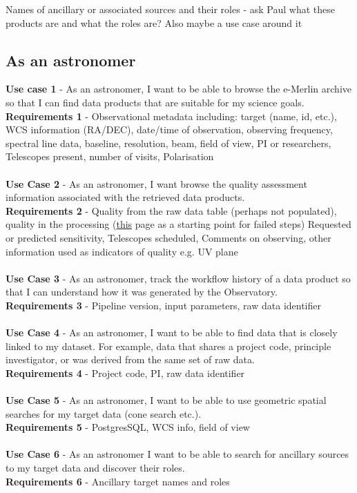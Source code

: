 Names of ancillary or associated sources and their roles - ask Paul what these products are and what the roles are? Also maybe a use case around it

\subsection{As an astronomer}

{\bf Use case 1} - As an astronomer, I want to be able to browse the e-Merlin archive so that I can find data products that are suitable for my science goals.
\\
{\bf Requirements 1} - Observational metadata including: target (name, id, etc.), WCS information (RA/DEC), date/time of observation, observing  frequency, spectral line data, baseline, resolution, beam, field of view, PI or researchers, Telescopes present, number of visits, Polarisation
\\\\
{\bf Use Case 2} - As an astronomer, I want browse the quality assessment information associated with the retrieved data products.
\\
{\bf Requirements 2} - Quality from the raw data table (perhaps not populated), quality in the processing (\href{https://www.e-merlin.ac.uk/distribute/CY8/TS8004/TS8004_C_001_20190801/weblog/pipelineinfo.html}{this} page as a starting point for failed steps) Requested or predicted sensitivity, Telescopes scheduled, Comments on observing, other information used as indicators of quality e.g. UV plane
\\\\
{\bf Use Case 3} - As an astronomer, track the workflow history of a data product so that I can understand how it was generated by the Observatory.
\\
{\bf Requirements 3} - Pipeline version, input parameters, raw data identifier
\\\\
{\bf Use Case 4} - As an astronomer, I want to be able to find data that is closely linked to my dataset. For example, data that shares a project code, principle investigator, or was derived from the same set of raw data. 
\\
{\bf Requirements 4} - Project code, PI, raw data identifier
\\\\
{\bf Use Case 5} - As an astronomer, I want to be able to use geometric spatial searches for my target data (cone search etc.).
\\
{\bf Requirements 5} - PostgresSQL, WCS info, field of view
\\\\
{\bf Use Case 6} - As an astronomer I want to be able to search for ancillary sources to my target data and discover their roles. 
\\
{\bf Requirements 6} - Ancillary target names and roles
\\\\
